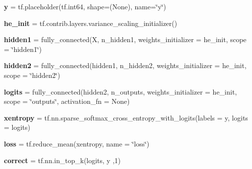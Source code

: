 \begin{DoxyCompactItemize}
{\bfseries y} = tf.\+placeholder(tf.\+int64, shape=(None), name=\char`\"{}y\char`\"{})
\item
\mbox{\label{namespacechemistry2quant_1_1chem2quant__NN_adaa42d9bfda5556d84893d20564a0587}}
{\bfseries he\+\_\+init} = tf.\+contrib.\+layers.\+variance\+\_\+scaling\+\_\+initializer()
\item
\mbox{\label{namespacechemistry2quant_1_1chem2quant__NN_a7c508a92b10b49d319dbaa4bf32f4603}}
{\bfseries hidden1} = fully\+\_\+connected(X, n\+\_\+hidden1, weights\+\_\+initializer = he\+\_\+init, scope = \char`\"{}hidden1\char`\"{})
\item
\mbox{\label{namespacechemistry2quant_1_1chem2quant__NN_ae5e03ae2343b49f236c2a942a5c8047c}}
{\bfseries hidden2} = fully\+\_\+connected(hidden1, n\+\_\+hidden2, weights\+\_\+initializer = he\+\_\+init, scope = \char`\"{}hidden2\char`\"{})
\item
\mbox{\label{namespacechemistry2quant_1_1chem2quant__NN_ab842ef6d43c1173baa2e074770117b1e}}
{\bfseries logits} = fully\+\_\+connected(hidden2, n\+\_\+outputs, weights\+\_\+initializer = he\+\_\+init, scope = \char`\"{}outputs\char`\"{}, activation\+\_\+fn = None)
\item
\mbox{\label{namespacechemistry2quant_1_1chem2quant__NN_a94a9ca4e3fb39656deba2044a94e5fd9}}
{\bfseries xentropy} = tf.\+nn.\+sparse\+\_\+softmax\+\_\+cross\+\_\+entropy\+\_\+with\+\_\+logits(labels = y, logits = logits)
\item
\mbox{\label{namespacechemistry2quant_1_1chem2quant__NN_a9a23dd52024165692c49df6102c996ce}}
{\bfseries loss} = tf.\+reduce\+\_\+mean(xentropy, name = \char`\"{}loss\char`\"{})
\item
\mbox{\label{namespacechemistry2quant_1_1chem2quant__NN_a4b3725ddf027f81477052fd33ce8e9a1}}
{\bfseries correct} = tf.\+nn.\+in\+\_\+top\+\_\+k(logits, y ,1)
\item
\mbox{\label{namespacechemistry2quant_1_1chem2quant__NN_ae9f1b8df536db132771bb8bc3c7430d3}}

\end{DoxyCompactItemize}
